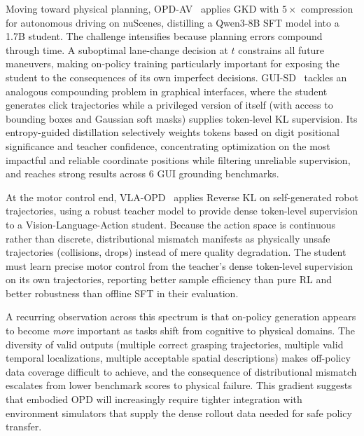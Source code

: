 \documentclass{article} %
\begin{document}
Moving toward physical planning, OPD-AV~\citep{2604.07944} applies GKD with $5\times$ compression for autonomous driving on nuScenes, distilling a Qwen3-8B SFT model into a 1.7B student. The challenge intensifies because planning errors compound through time. A suboptimal lane-change decision at $t$ constrains all future maneuvers, making on-policy training particularly important for exposing the student to the consequences of its own imperfect decisions. GUI-SD~\citep{2605.00642} tackles an analogous compounding problem in graphical interfaces, where the student generates click trajectories while a privileged version of itself (with access to bounding boxes and Gaussian soft masks) supplies token-level KL supervision. Its entropy-guided distillation selectively weights tokens based on digit positional significance and teacher confidence, concentrating optimization on the most impactful and reliable coordinate positions while filtering unreliable supervision, and reaches strong results across 6 GUI grounding benchmarks.

At the motor control end, VLA-OPD~\citep{2603.26666} applies Reverse KL on self-generated robot trajectories, using a robust teacher model to provide dense token-level supervision to a Vision-Language-Action student. Because the action space is continuous rather than discrete, distributional mismatch manifests as physically unsafe trajectories (collisions, drops) instead of mere quality degradation. The student must learn precise motor control from the teacher's dense token-level supervision on its own trajectories, reporting better sample efficiency than pure RL and better robustness than offline SFT in their evaluation.

A recurring observation across this spectrum is that on-policy generation appears to become \emph{more} important as tasks shift from cognitive to physical domains. The diversity of valid outputs (multiple correct grasping trajectories, multiple valid temporal localizations, multiple acceptable spatial descriptions) makes off-policy data coverage difficult to achieve, and the consequence of distributional mismatch escalates from lower benchmark scores to physical failure. This gradient suggests that embodied OPD will increasingly require tighter integration with environment simulators that supply the dense rollout data needed for safe policy transfer.
\end{document}

